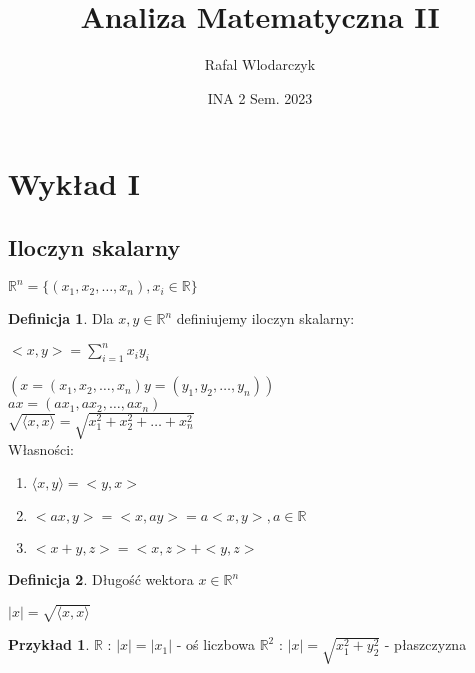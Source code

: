 \documentclass{article}
\author{Rafal Wlodarczyk}
\title{Analiza Matematyczna II}
\date{INA 2 Sem. 2023}
\theoremstyle{definition}
\newtheorem{de}{Definicja}[subsection]
\theoremstyle{definition}
\theoremstyle{definition}
\newtheorem{pk}{Przykład}[subsection]
\theoremstyle{definition}
\begin{document}
\maketitle

\section{Wykład I}

\subsection{Iloczyn skalarny}

$\mathbb{R}^n=\{(x_1,x_2,\dots, x_n), x_i \in \mathbb{R}\}$

\begin{de}
Dla $x,y \in \mathbb{R}^n$ definiujemy iloczyn skalarny:
\begin{center}
    $<x,y> = \sum_{i=1}^{n} x_i y_i$
\end{center}
$(x=(x_1,x_2,\dots, x_n) y = (y_1,y_2,\dots, y_n))$\\
$ax = (ax_1, ax_2, \dots, ax_n)$\\
$\sqrt{\langle x,x \rangle} = \sqrt{x_1^2+x_2^2+\dots+x_n^2}$\\
Własności:
\begin{enumerate}
    \item $\langle x,y \rangle = <y,x>$
    \item $<ax,y> = <x,ay> = a<x,y>, a \in \mathbb{R}$
    \item $<x+y,z>=<x,z>+<y,z>$
\end{enumerate}
\end{de}

\begin{de}
    Długość wektora $x\in \mathbb{R}^n$\\
    \begin{center}
        $|x|=\sqrt{\langle x,x \rangle}$
    \end{center}
\end{de}

\begin{pk}
	$\mathbb{R}$ : $|x|=|x_1|$ - oś liczbowa
	$\mathbb{R}^2$ : $|x|=\sqrt{x_1^2+y_2^2}$ - płaszczyzna
\end{pk}
\end{document}
